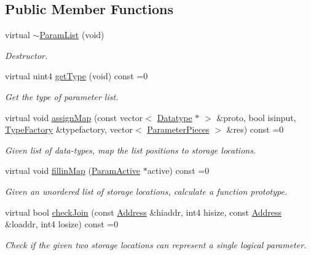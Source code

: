 \subsection*{Public Member Functions}
\begin{DoxyCompactItemize}
\item 
virtual \mbox{\hyperlink{class_param_list_ae628b7e9e0e780197b86fa312d52b1c8}{$\sim$\+Param\+List}} (void)
\begin{DoxyCompactList}\small\item\em Destructor. \end{DoxyCompactList}\item 
virtual uint4 \mbox{\hyperlink{class_param_list_a9e3de5eb123af1ab9122de9f32e63859}{get\+Type}} (void) const =0
\begin{DoxyCompactList}\small\item\em Get the type of parameter list. \end{DoxyCompactList}\item 
virtual void \mbox{\hyperlink{class_param_list_ab30f200d65a2c66f434506acc77d384e}{assign\+Map}} (const vector$<$ \mbox{\hyperlink{class_datatype}{Datatype}} $\ast$ $>$ \&proto, bool isinput, \mbox{\hyperlink{class_type_factory}{Type\+Factory}} \&typefactory, vector$<$ \mbox{\hyperlink{struct_parameter_pieces}{Parameter\+Pieces}} $>$ \&res) const =0
\begin{DoxyCompactList}\small\item\em Given list of data-\/types, map the list positions to storage locations. \end{DoxyCompactList}\item 
virtual void \mbox{\hyperlink{class_param_list_aaf2680343e933767d7ffd38e22e84011}{fillin\+Map}} (\mbox{\hyperlink{class_param_active}{Param\+Active}} $\ast$active) const =0
\begin{DoxyCompactList}\small\item\em Given an unordered list of storage locations, calculate a function prototype. \end{DoxyCompactList}\item 
virtual bool \mbox{\hyperlink{class_param_list_afbd77bcf71722f89a9ad9f4d9d20bdc5}{check\+Join}} (const \mbox{\hyperlink{class_address}{Address}} \&hiaddr, int4 hisize, const \mbox{\hyperlink{class_address}{Address}} \&loaddr, int4 losize) const =0
\begin{DoxyCompactList}\small\item\em Check if the given two storage locations can represent a single logical parameter. \end{DoxyCompactList}\item 

\end{DoxyCompactItemize}
